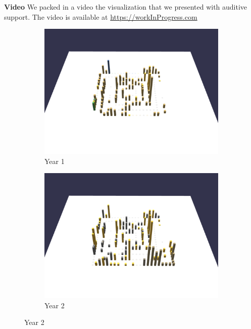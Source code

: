 \textbf{Video}
We packed in a video the visualization that we presented with auditive support. The video is available at \url{https://workInProgress.com}

\begin{figure}[ht]
    \begin{subfigure}{0.50\textwidth}
        \includegraphics[width=\linewidth]{JetUML_V3S1.png}
        \caption{Year 1} 
        \label{fig:JetUML_V3S1}
    \end{subfigure}\hspace*{\fill}
    \begin{subfigure}{0.50\textwidth}
        \includegraphics[width=\linewidth]{JetUML_V3S2.png}
        \caption{Year 2} 
        \label{fig:JetUML_V3S2}
    \end{subfigure}
    

\end{figure}
